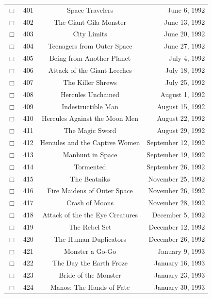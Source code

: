 \documentclass[12pt]{article}
\begin{document}
\begin{center}
\begin{longtable}[c]{cccr}
\\  %
$\Box$&401&Space Travelers&June  6, 1992\\
$\Box$&402&The Giant Gila Monster&June 13, 1992\\
$\Box$&403&City Limits&June 20, 1992\\
$\Box$&404&Teenagers from Outer Space&June 27, 1992\\
$\Box$&405&Being from Another Planet&July  4, 1992\\
$\Box$&406&Attack of the Giant Leeches&July 18, 1992\\
$\Box$&407&The Killer Shrews&July 25, 1992\\
$\Box$&408&Hercules Unchained&August  1, 1992\\
$\Box$&409&Indestructible Man&August 15, 1992\\
$\Box$&410&Hercules Against the Moon Men&August 22, 1992\\
$\Box$&411&The Magic Sword&August 29, 1992\\
$\Box$&412&Hercules and the Captive Women&September 12, 1992\\
$\Box$&413&Manhunt in Space&September 19, 1992\\
$\Box$&414&Tormented&September 26, 1992\\
$\Box$&415&The Beatniks&November 25, 1992\\
$\Box$&416&Fire Maidens of Outer Space&November 26, 1992\\
$\Box$&417&Crash of Moons&November 28, 1992\\
$\Box$&418&Attack of the the Eye Creatures&December  5, 1992\\
$\Box$&419&The Rebel Set&December 12, 1992\\
$\Box$&420&The Human Duplicators&December 26, 1992\\
$\Box$&421&Monster a Go-Go&January  9, 1993\\
$\Box$&422&The Day the Earth Froze&January 16, 1993\\
$\Box$&423&Bride of the Monster&January 23, 1993\\
$\Box$&424&Manos: The Hands of Fate&January 30, 1993\\  %


\end{longtable}
\end{center}
\end{document}
